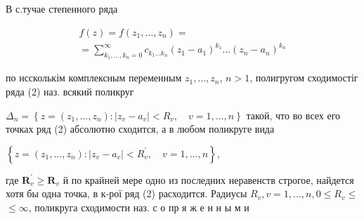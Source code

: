 \documentclass[10pt]{article}
\begin{document}
В с.тучае степенного ряда



\[

\begin{gathered}

f(z)=f\left(z_{1}, \ldots, z_{n}\right)= \\

=\sum_{k_{1}, \ldots, k_{n}=0}^{\infty} c_{k_{1} \ldots k_{n}}\left(z_{1}-a_{1}\right)^{k_{1}} \ldots\left(z_{n}-a_{n}\right)^{k_{n}}

\end{gathered}

\]



по нссколькім комплексным переменным $z_{1}, \ldots, z_{n}$, $n>1$, полигругом сходимостіг ряда (2) наз. всякий поликруг



$\Delta_{n}=\left\{z=\left(z_{1}, \ldots, z_{n}\right):\left|z_{v}-a_{v}\right|<R_{v}, \quad v=1, \ldots, n\right\}$ такой, что во всех его точках ряд (2) абсолютно сходится, а в любом поликруге вида



$\left\{z=\left(z_{1}, \ldots, z_{n}\right):\left|z_{v}-a_{v}\right|<R_{v}^{\prime}, \quad v=1, \ldots, n\right\}$,



где $\boldsymbol{R}_{v}^{\prime} \geqslant \boldsymbol{R}_{v}$ й по крайней мере одно из последних неравенств строгое, найдется хотя бы одна точка, в к-рої ряд (2) расходится. Радиусы $R_{v}, v=1, \ldots, n, 0 \leqslant R_{v} \leqslant$ $\leqslant \infty$, поликруга сходимости наз. с о пр я ж е н н ы м и
\end{document}
